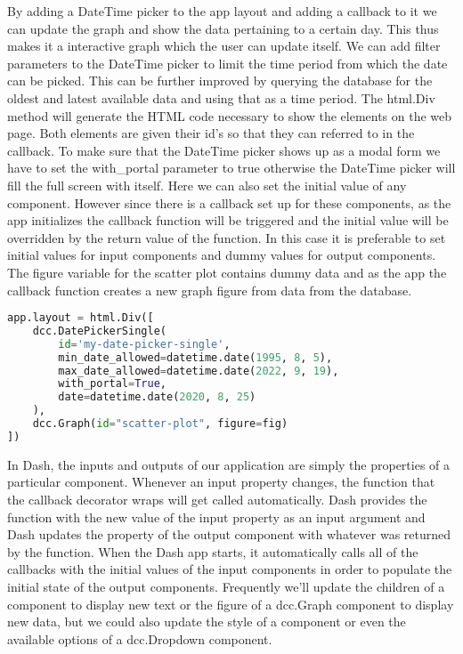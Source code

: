 By adding a DateTime picker to the app layout and adding a callback to it we can
update the graph and show the data pertaining to a certain day. This thus makes
it a interactive graph which the user can update itself. We can add filter
parameters to the DateTime picker to limit the time period from which the date
can be picked. This can be further improved by querying the database for the
oldest and latest available data and using that as a time period. The html.Div
method will generate the HTML code necessary to show the elements on the web
page. Both elements are given their id's so that they can referred to in the
callback. To make sure that the DateTime picker shows up as a modal form we have
to set the with\_portal parameter to true otherwise the DateTime picker will
fill the full screen with itself. Here we can also set the initial value of any
component. However since there is a callback set up for these components, as the
app initializes the callback function will be triggered and the initial value
will be overridden by the return value of the function. In this case it is
preferable to set initial values for input components and dummy values for
output components. The figure variable for the scatter plot contains dummy data
and as the app the callback function creates a new graph figure from data from
the database. 

\begin{lstlisting}[language={Python}]
app.layout = html.Div([
	dcc.DatePickerSingle(
		id='my-date-picker-single',
		min_date_allowed=datetime.date(1995, 8, 5),
		max_date_allowed=datetime.date(2022, 9, 19),
		with_portal=True,
		date=datetime.date(2020, 8, 25)
	),
	dcc.Graph(id="scatter-plot", figure=fig)
])
\end{lstlisting}

In Dash, the inputs and outputs of our application are simply the properties of
a particular component. Whenever an input property changes, the function that
the callback decorator wraps will get called automatically. Dash provides the
function with the new value of the input property as an input argument and Dash
updates the property of the output component with whatever was returned by the
function. When the Dash app starts, it automatically calls all of the callbacks
with the initial values of the input components in order to populate the initial
state of the output components. Frequently we'll update the children of a
component to display new text or the figure of a dcc.Graph component to display
new data, but we could also update the style of a component or even the
available options of a dcc.Dropdown component. \cite{dash_basic_callbacks}

